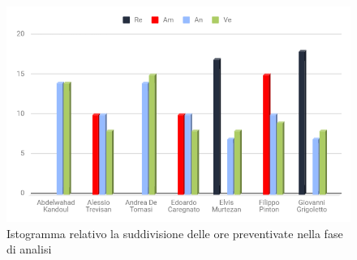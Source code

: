 \begin{figure}[h!]
	\caption{Istogramma relativo la suddivisione delle ore preventivate nella fase di analisi}
	\includegraphics[width=1\textwidth]{./src/Preventivo/src/img/IstoAnalisi.png}
\end{figure}
\clearpage

